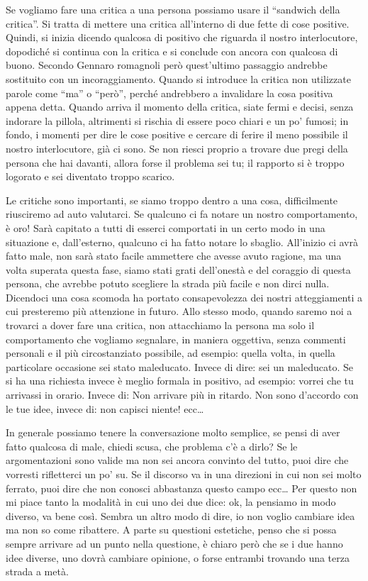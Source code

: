 \documentclass[12pt]{book} %
\begin{document}
Se vogliamo fare una critica a una persona possiamo usare il “sandwich della critica”. Si tratta di mettere una critica
all'interno di due fette di cose positive. Quindi, si inizia dicendo qualcosa di positivo che
riguarda il nostro interlocutore, dopodiché si continua con la critica e si conclude con ancora con qualcosa di buono.
Secondo Gennaro romagnoli però quest'ultimo passaggio andrebbe sostituito con un incoraggiamento. 
Quando si introduce la critica non utilizzate parole come “ma” o “però”, perché andrebbero a invalidare la cosa
positiva appena detta. Quando arriva il momento della critica, siate fermi e decisi, senza indorare la pillola,
altrimenti si rischia di essere poco chiari e un po' fumosi; in fondo, i momenti per dire le cose
positive e cercare di ferire il meno possibile il nostro interlocutore, già ci sono. Se non riesci proprio a trovare
due pregi della persona che hai davanti, allora forse il problema sei tu; il rapporto si è troppo logorato e sei
diventato troppo scarico.

Le critiche sono importanti, se siamo troppo dentro a una cosa, difficilmente riusciremo ad auto valutarci. 
Se qualcuno ci fa notare un nostro comportamento, è oro! Sarà capitato a tutti di esserci comportati
in un certo modo in una situazione e, dall'esterno, qualcuno ci ha fatto notare lo sbaglio.
All'inizio ci avrà fatto male, non sarà stato facile ammettere che avesse avuto ragione, ma una
volta superata questa fase, siamo stati grati dell'onestà e del coraggio di questa persona, che avrebbe potuto scegliere la strada più facile e non dirci nulla.
Dicendoci una cosa scomoda ha portato consapevolezza dei nostri atteggiamenti a cui presteremo più attenzione in
futuro. Allo stesso modo, quando saremo noi a trovarci a dover fare una critica, non attacchiamo la persona ma solo il
comportamento che vogliamo segnalare, in maniera oggettiva, senza commenti personali e il più circostanziato possibile,
ad esempio: quella volta, in quella particolare occasione sei stato maleducato. Invece di dire: sei un maleducato. Se
si ha una richiesta invece è meglio formala in positivo, ad esempio: vorrei che tu arrivassi in orario. Invece di: Non
arrivare più in ritardo. Non sono d'accordo con le tue idee, invece di: non capisci niente! ecc…

In generale possiamo tenere la conversazione molto semplice, se pensi di aver fatto qualcosa di male, chiedi scusa, che problema c'è a dirlo? Se le argomentazioni sono valide ma non sei ancora convinto del tutto, puoi dire che vorresti rifletterci un po' su. Se il discorso va in una direzioni in cui non sei molto ferrato, puoi dire che non conosci abbastanza questo campo ecc…
Per questo non mi piace tanto la modalità in cui uno dei due dice: ok, la pensiamo in modo diverso, va bene così. Sembra un altro modo di dire, io non voglio cambiare idea ma non so come ribattere. A parte su questioni estetiche, penso che si possa sempre arrivare ad un punto nella questione, è chiaro però che se i due hanno idee diverse, uno dovrà cambiare opinione, o forse entrambi trovando una terza strada a metà.
\end{document}
